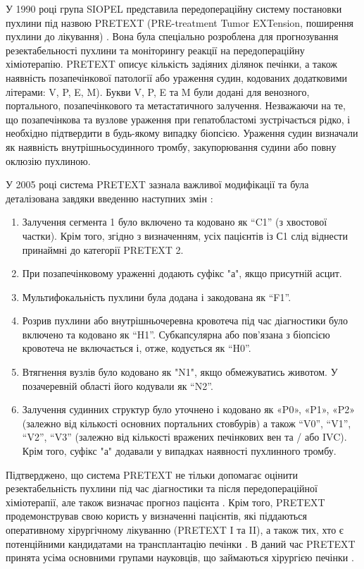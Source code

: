 У 1990 році група SIOPEL представила передопераційну систему постановки пухлини під назвою PRETEXT (PRE-treatment Tumor EXTension, поширення пухлини до лікування) \cite{pmid28921939}. Вона була спеціально розроблена для прогнозування резектабельності пухлини та моніторингу реакції на передопераційну хіміотерапію. PRETEXT описує кількість задіяних ділянок печінки, а також наявність позапечінкової патології або ураження судин, кодованих додатковими літерами: V, P, E, M). Букви V, P, E та M були додані для венозного, портального, позапечінкового та метастатичного залучення. Незважаючи на те, що позапечінкова та вузлове ураження при гепатобластомі зустрічається рідко, і необхідно  підтвердити в будь-якому випадку біопсією. Ураження судин визначали як наявність внутрішньосудинного тромбу, закупорювання судини або повну оклюзію пухлиною. 

У 2005 році система PRETEXT зазнала важливої модифікації та була деталізована завдяки введенню наступних змін \cite{pmid29286034}:

\begin{enumerate}
    \item Залучення сегмента 1 було включено та кодовано як “C1” (з хвостової частки). Крім того, згідно з визначенням, усіх пацієнтів із С1 слід віднести принаймні до категорії PRETEXT 2.  
    \item При позапечінковому ураженні додають суфікс "а", якщо присутній асцит.
    \item Мультифокальність пухлини була додана і закодована як “F1”.
    \item Розрив пухлини або внутрішньочеревна кровотеча під час діагностики було включено та кодовано як “H1”. Субкапсулярна або пов’язана з біопсією кровотеча не включається і, отже, кодується як “H0”.
    \item Втягнення вузлів було кодовано як "N1", якщо обмежуватись животом. У позачеревній області його кодували як “N2”.
    \item Залучення судинних структур було уточнено і кодовано як «P0», «P1», «P2» (залежно від кількості основних портальних стовбурів) а також “V0”, “V1”, “V2”, “V3” (залежно від кількості вражених печінкових вен та / або IVC). Крім того, суфікс "а" додавали у випадках наявності пухлинного тромбу.
\end{enumerate}
\vspace{2em}

Підтверджено, що система PRETEXT не тільки допомагає оцінити резектабельність пухлини під час діагностики та після передопераційної хіміотерапії, але також визначає прогноз пацієнта \cite{pmid28203111}. Крім того, PRETEXT продемонстрував свою користь у визначенні пацієнтів, які піддаються оперативному хірургічному лікуванню (PRETEXT I та II), а також тих, хто є потенційними кандидатами на трансплантацію печінки \cite{pmid29341393}. В даний час PRETEXT принята усіма основними групами науковців, що займаються хірургією печінки \cite{pmid29375822}.

